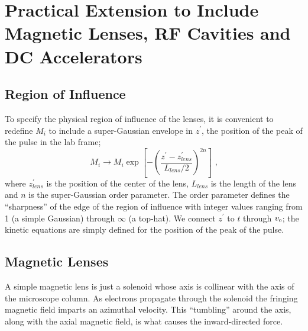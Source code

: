 
\section{Practical Extension to Include Magnetic Lenses, RF Cavities and DC Accelerators}

\subsection{Region of Influence}

To specify the physical region of influence of the lenses, it is convenient to redefine $M_{i}$ to include a super-Gaussian envelope in $z^{\prime}$, the position of the peak of the pulse in the lab frame;
\begin{equation} \label{eq:reg_of_influence}
  M_{i}	\to M_{i} \exp \left [ - \left (  \frac{ z^{\prime} - z_{lens}^{\prime} }{ L_{lens} / 2 } \right )^{ 2 n } \right ] \text{ ,}
\end{equation}
where $z_{lens}^{\prime}$ is the position of the center of the lens, $L_{lens}$ is the length of the lens and $n$ is the super-Gaussian order parameter.
The order parameter defines the ``sharpness'' of the edge of the region of influence with integer values ranging from 1 (a simple Gaussian) through $\infty$ (a top-hat).
We connect $z^{\prime}$ to $t$ through $ v_{{\scriptscriptstyle 0}} $; the kinetic equations are simply defined for the position of the peak of the pulse.

\subsection{Magnetic Lenses}

A simple magnetic lens is just a solenoid whose axis is collinear with the axis of the microscope column.
As electrons propagate through the solenoid the fringing magnetic field imparts an azimuthal velocity.
This ``tumbling'' around the axis, along with the axial magnetic field, is what causes the inward-directed force. 

